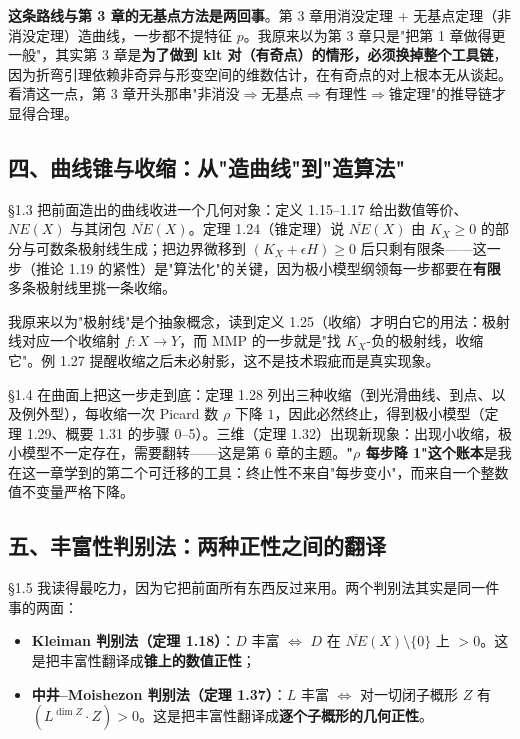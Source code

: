 \textbf{这条路线与第 3 章的无基点方法是两回事}。第 3 章用消没定理 + 无基点定理（非消没定理）造曲线，一步都不提特征 $p$。我原来以为第 3 章只是"把第 1 章做得更一般"，其实第 3 章是\textbf{为了做到 klt 对（有奇点）的情形，必须换掉整个工具链}，因为折弯引理依赖非奇异与形变空间的维数估计，在有奇点的对上根本无从谈起。看清这一点，第 3 章开头那串"非消没$\Rightarrow$无基点$\Rightarrow$有理性$\Rightarrow$锥定理"的推导链才显得合理。

\subsection*{四、曲线锥与收缩：从"造曲线"到"造算法"}

\S1.3 把前面造出的曲线收进一个几何对象：定义 1.15--1.17 给出数值等价、$NE(X)$ 与其闭包 $\overline{NE}(X)$。定理 1.24（锥定理）说 $\overline{NE}(X)$ 由 $K_X\ge0$ 的部分与可数条极射线生成；把边界微移到 $(K_X+\epsilon H)\ge0$ 后只剩有限条——这一步（推论 1.19 的紧性）是"算法化"的关键，因为极小模型纲领每一步都要在\textbf{有限}多条极射线里挑一条收缩。

我原来以为"极射线"是个抽象概念，读到定义 1.25（收缩）才明白它的用法：极射线对应一个收缩射 $f:X\to Y$，而 MMP 的一步就是"找 $K_X$-负的极射线，收缩它"。例 1.27 提醒收缩之后未必射影，这不是技术瑕疵而是真实现象。

\S1.4 在曲面上把这一步走到底：定理 1.28 列出三种收缩（到光滑曲线、到点、以及例外型），每收缩一次 Picard 数 $\rho$ 下降 $1$，因此必然终止，得到极小模型（定理 1.29、概要 1.31 的步骤 0--5）。三维（定理 1.32）出现新现象：出现小收缩，极小模型不一定存在，需要翻转——这是第 6 章的主题。\textbf{"$\rho$ 每步降 1"这个账本}是我在这一章学到的第二个可迁移的工具：终止性不来自"每步变小"，而来自一个整数值不变量严格下降。

\subsection*{五、丰富性判别法：两种正性之间的翻译}

\S1.5 我读得最吃力，因为它把前面所有东西反过来用。两个判别法其实是同一件事的两面：

\begin{itemize}
\item \textbf{Kleiman 判别法（定理 1.18）}：$D$ 丰富 $\iff$ $D$ 在 $\overline{NE}(X)\setminus\{0\}$ 上 $>0$。这是把丰富性翻译成\textbf{锥上的数值正性}；
\item \textbf{中井--Moishezon 判别法（定理 1.37）}：$L$ 丰富 $\iff$ 对一切闭子概形 $Z$ 有 $(L^{\dim Z}\cdot Z)>0$。这是把丰富性翻译成\textbf{逐个子概形的几何正性}。
\end{itemize}

